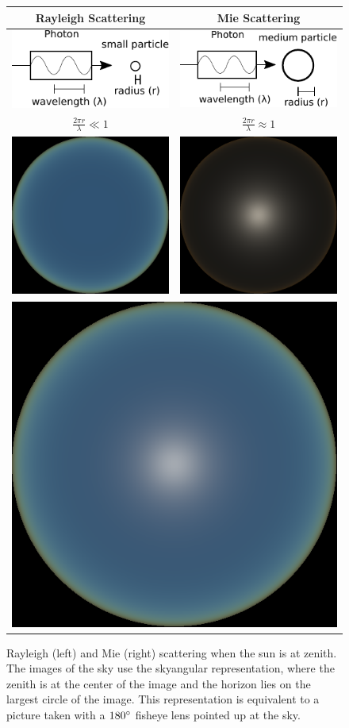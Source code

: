 \begin{figure}
\centering
\newcommand\Tstrut{\rule{0pt}{1\normalbaselineskip}}         %
\newcommand\TTstrut{\rule{0pt}{8.4\normalbaselineskip}}         %
\newcommand\Bstrut{\rule[-1.5em]{0pt}{0pt}}   %
\begin{tabular}{|c|c|}
\hline
\Tstrut Rayleigh Scattering & Mie Scattering \\ \hline
\rule{0pt}{5\normalbaselineskip}\includegraphics[width=0.25\linewidth]{simulation/small_particle.pdf} &
\includegraphics[width=0.25\linewidth]{simulation/medium_particle.pdf}\\
\rule{0pt}{1.5\normalbaselineskip}\Bstrut $\frac{2\pi r}{\lambda} \ll 1$ & $\frac{2\pi r}{\lambda} \approx 1$\\ \hline
\TTstrut\includegraphics[width=0.25\linewidth]{simulation/skydome_rayleigh.png} &
\includegraphics[width=0.25\linewidth]{simulation/skydome_mie.png} \\ \hline
\multicolumn{2}{|c|}{
\TTstrut\includegraphics[width=0.25\linewidth]{simulation/skydome.png}} \\ \hline
\end{tabular}
\caption[Visualisations of the Rayleigh and Mie scattering]{Rayleigh (left) and Mie (right) scattering when the sun is at zenith. The images of the sky use the skyangular representation, where the zenith is at the center of the image and the horizon lies on the largest circle of the image. This representation is equivalent to a picture taken with a $180^{\circ}$ fisheye lens pointed up at the sky.}
\label{fig:physics_simulations}
\end{figure}

